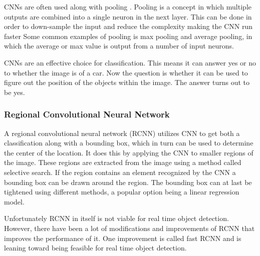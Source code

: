 CNNs are often used along with pooling \cite{CNN}.
Pooling is a concept in which multiple outputs are combined into a single neuron in the next layer.
This can be done in order to down-sample the input and reduce the complexity making the CNN run faster
Some common examples of pooling is max pooling and average pooling, in which the average or max value is output from a number of input neurons.

CNNs are an effective choice for classification. 
This means it can answer yes or no to whether the image is of a car.
Now the question is whether it can be used to figure out the position of the objects within the image.
The answer turns out to be yes.


\subsubsection{Regional Convolutional Neural Network}

A regional convolutional neural network (RCNN) utilizes CNN to get both a classification along with a bounding box, which in turn can be used to determine the center of the location.
It does this by applying the CNN to smaller regions of the image. 
These regions are extracted from the image using a method called selective search.
If the region contains an element recognized by the CNN a bounding box can be drawn around the region.
The bounding box can at last be tightened using different methods, a popular option being a linear regression model.\cite{CNNHistory}

Unfortunately RCNN in itself is not viable for real time object detection.
However, there have been a lot of modifications and improvements of RCNN that improves the performance of it.
One improvement is called fast RCNN and is leaning toward being feasible for real time object detection.





